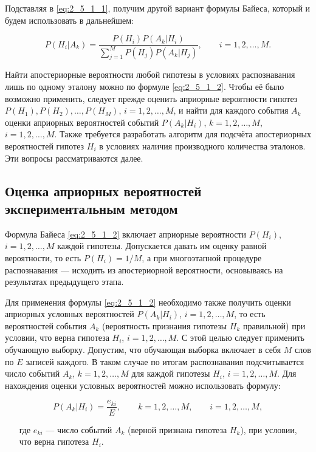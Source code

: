 Подставляя в \eqref{eq:2_5_1_1}, получим другой вариант формулы Байеса, который и будем использовать в дальнейшем:

\begin{equation}\label{eq:2_5_1_2}
P(H_i|A_k) = \frac{P(H_i) P(A_k|H_i)}{\sum_{j=1}^M P(H_j) P(A_k|H_j)},
\qquad
i = 1, 2, \dots, M.
\end{equation}

Найти апостериорные вероятности любой гипотезы в условиях распознавания лишь по одному эталону можно по формуле \eqref{eq:2_5_1_2}.
Чтобы её было возможно применить, следует прежде оценить априорные вероятности гипотез $P(H_1), P(H_2), \dots, P(H_M)$, $i = 1, 2, \dots, M$, и найти для каждого события $A_k$ оценки априорных вероятностей событий $P(A_k|H_i)$, $k = 1, 2, \dots, M$, $i = 1, 2, \dots, M$.
Также требуется разработать алгоритм для подсчёта апостериорных вероятностей гипотез $H_i$ в условиях наличия производного количества эталонов.
Эти вопросы рассматриваются далее.


\subsection{Оценка априорных вероятностей экспериментальным методом} \label{sect2_5_2}

Формула Байеса \eqref{eq:2_5_1_2} включает априорные вероятности $P(H_i)$, $i = 1, 2, \dots, M$ каждой гипотезы.
Допускается давать им оценку равной вероятности, то есть $P(H_i) = 1/M$, а при многоэтапной процедуре распознавания --- исходить из апостериорной вероятности, основываясь на результатах предыдущего этапа.

Для применения формулы \eqref{eq:2_5_1_2} необходимо также получить оценки априорных условных вероятностей $P(A_k|H_i)$, $i = 1, 2, \dots, M$, то есть вероятностей события $A_k$ (вероятность признания гипотезы $H_k$ правильной) при условии, что верна гипотеза $H_i$, $i = 1, 2, \dots, M$.
С этой целью следует применить обучающую выборку.
Допустим, что обучающая выборка включает в себя $M$ слов по $E$ записей каждого.
В таком случае по итогам распознавания подсчитывается число событий $A_k$, $k = 1, 2, \dots, M$ для каждой гипотезы $H_i$, $i = 1, 2, \dots, M$.
Для нахождения оценки условных вероятностей можно использовать формулу:

\begin{equation}\label{eq:2_5_2_1}
P(A_k|H_i) = \frac{e_{ki}}{E},
\qquad
k = 1, 2, \dots, M,
\qquad
i = 1, 2, \dots, M,
\end{equation}
\begin{itemize}[align=left,leftmargin=1.8em,itemindent=0pt,labelsep=0pt,labelwidth=1.8em]
	\item[где] $e_{ki}$ --- число событий $A_k$ (верной признана гипотеза $H_k$), при условии, что верна гипотеза $H_i$.
\end{itemize}

